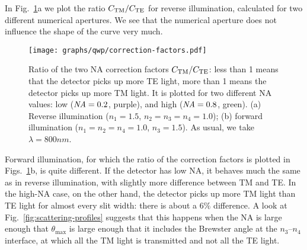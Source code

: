 In Fig.~\ref{qwp:fig:correction-factors}a we plot the ratio $C_{\text{TM}}/C_{\text{TE}}$ for reverse illumination, calculated for two different numerical apertures.
We see that the numerical aperture does not influence the shape of the curve very much.
%
\begin{figure*}[tbp]
\centering\texttt{[image: graphs/qwp/correction-factors.pdf]}
\caption{Ratio of the two \gls{NA} correction factors $C_{\text{TM}}/C_{\text{TE}}$: less than 1 means that the detector picks up more \gls{TE} light, more than 1 means the detector picks up more \gls{TM} light.
It is plotted for two different \gls{NA} values: low ($\mbox{\em NA}=0.2$, purple), and high ($\mbox{\em NA}=0.8$, green).
(a) Reverse illumination ($n_1 = 1.5$, $n_2 = n_3 = n_4 = 1.0$);
(b) forward illumination ($n_1 = n_2 = n_4 = 1.0$, $n_3 = 1.5$).
As usual, we take $\lambda=800\unit{nm}$.}
\label{qwp:fig:correction-factors}
\end{figure*}

Forward illumination, for which the ratio of the correction factors is plotted in Figs.~\ref{qwp:fig:correction-factors}b, is quite different.
If the detector has low \gls{NA}, it behaves much the same as in reverse illumination, with slightly more difference between \gls{TM} and \gls{TE}.
In the high-\gls{NA} case, on the other hand, the detector picks up more \gls{TM} light than \gls{TE} light for almost every slit width: there is about a $6\%$ difference.
A look at Fig.~\ref{fig:scattering-profiles} suggests that this happens when the \gls{NA} is large enough that $\theta_\mathrm{max}$ is large enough that it includes the Brewster angle at the $n_3$--$n_4$ interface, at which all the \gls{TM} light is transmitted and not all the \gls{TE} light.



